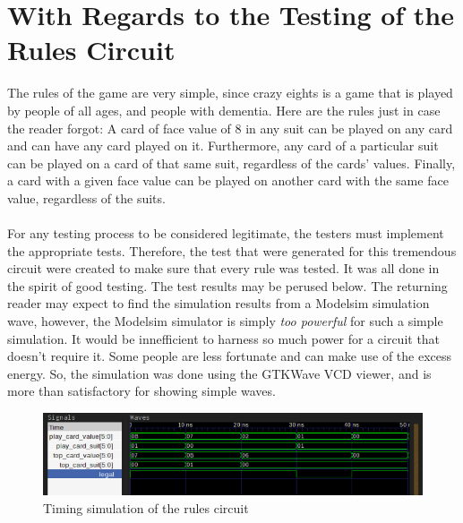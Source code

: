 \documentclass[12pt]{report}
\begin{document}
\chapter*{With Regards to the Testing of the Rules Circuit}
The rules of the game are very simple, since crazy eights is a game that is played by people of all
ages, and people with dementia. Here are the rules just in case the reader forgot: A card of face
value of 8 in any suit can be played on any card and can have any card played on it. Furthermore,
any card of a particular suit can be played on a card of that same suit, regardless of the cards'
values. Finally, a card with a given face value can be played on another card with the same face
value, regardless of the suits.\\\\
For any testing process to be considered legitimate, the testers must implement the appropriate
tests. Therefore, the test that were generated for this tremendous circuit were created to make sure
that every rule was tested. It was all done in the spirit of good testing. The test results may be
perused below. The returning reader may expect to find the simulation results from a Modelsim
simulation wave, however, the Modelsim simulator is simply \textit{too powerful} for such a simple
simulation. It would be innefficient to harness so much power for a circuit that doesn't require it.
Some people are less fortunate and can make use of the excess energy. So, the simulation was done
using the GTKWave VCD viewer, and is more than satisfactory for showing simple waves.

\begin{figure}[h]
	\begin{center}
		\caption{Timing simulation of the rules circuit}
		\includegraphics[scale=0.8]{rulesresults}
	\end{center}
\end{figure}
\end{document}
